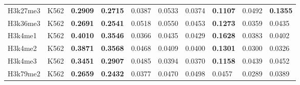 \begin{table}[!ht]
\begin{tabular}{ll|ll|ll|ll|ll}
H3k27me3                             & K562                                   & {\color[HTML]{CB0000} \textbf{0.2909}}                       & {\color[HTML]{CB0000} \textbf{0.2715}}                      & 0.0387                                & 0.0533                               & 0.0374                                & {\color[HTML]{CB0000} \textbf{0.1107}} & 0.0492                                & {\color[HTML]{CB0000} \textbf{0.1355}} \\
H3k36me3                             & K562                                   & {\color[HTML]{CB0000} \textbf{0.2691}}                       & {\color[HTML]{CB0000} \textbf{0.2541}}                      & 0.0518                                & 0.0550                               & 0.0453                                & {\color[HTML]{CB0000} \textbf{0.1273}} & 0.0359                                & 0.0435                                 \\
H3k4me1                              & K562                                   & {\color[HTML]{CB0000} \textbf{0.4010}}                       & {\color[HTML]{CB0000} \textbf{0.3546}}                      & 0.0366                                & 0.0435                               & 0.0429                                & {\color[HTML]{CB0000} \textbf{0.1628}} & 0.0383                                & 0.0402                                 \\
H3k4me2                              & K562                                   & {\color[HTML]{CB0000} \textbf{0.3871}}                       & {\color[HTML]{CB0000} \textbf{0.3568}}                      & 0.0468                                & 0.0409                               & 0.0400                                & {\color[HTML]{CB0000} \textbf{0.1301}} & 0.0300                                & 0.0326                                 \\
H3k4me3                              & K562                                   & {\color[HTML]{CB0000} \textbf{0.3451}}                       & {\color[HTML]{CB0000} \textbf{0.2907}}                      & 0.0485                                & 0.0394                               & 0.0370                                & {\color[HTML]{CB0000} \textbf{0.1158}} & 0.0439                                & 0.0452                                 \\
H3k79me2                             & K562                                   & {\color[HTML]{CB0000} \textbf{0.2659}}                       & {\color[HTML]{CB0000} \textbf{0.2432}}                      & 0.0377                                & 0.0470                               & 0.0498                                & 0.0457                                 & 0.0289                                & 0.0389                                 \\

\end{tabular}
\end{table}
